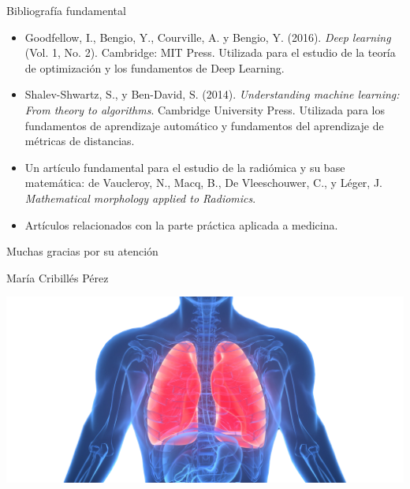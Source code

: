 \documentclass{beamer}
\begin{document}
\begin{frame}{Bibliografía fundamental}
\begin{itemize}
    \item Goodfellow, I., Bengio, Y., Courville, A. y Bengio, Y. (2016). \textit{Deep learning} (Vol. 1, No. 2). Cambridge: MIT Press. Utilizada para el estudio de la teoría de optimización y los fundamentos de Deep Learning. 
    \item Shalev-Shwartz, S., y Ben-David, S. (2014). \textit{Understanding machine learning: From theory to algorithms}. Cambridge University Press. Utilizada para los fundamentos de aprendizaje automático y fundamentos del aprendizaje de métricas de distancias.
    \item Un artículo fundamental para el estudio de la radiómica y su base matemática: de Vaucleroy, N., Macq, B., De Vleeschouwer, C., y Léger, J. \textit{Mathematical morphology applied to Radiomics}.
    \item Artículos relacionados con la parte práctica aplicada a medicina. 
\end{itemize}
\end{frame}

\begin{frame} 
    \centering
    \vspace{0.5cm}
    {\Huge Muchas gracias por su atención}

    \vspace{0.5cm}
    {\Large María Cribillés Pérez} 

    \vspace{0.5cm}
    \includegraphics[width=1\textwidth]{img/lungs3dtc.png}
\end{frame}
\end{document}
